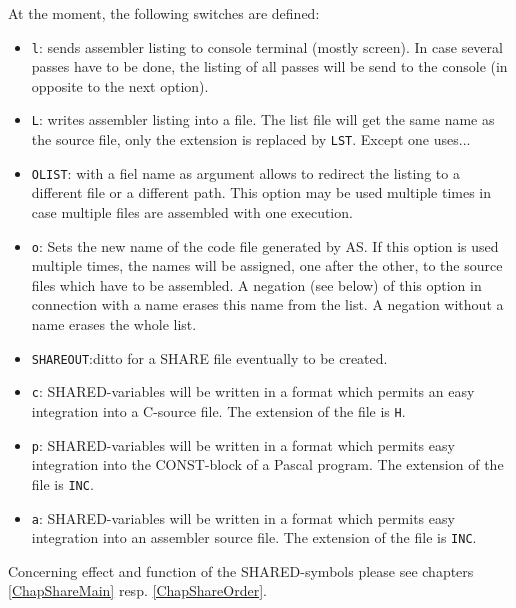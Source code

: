 \documentclass[12pt,twoside]{report}
\makeatletter
\newcommand{\tty}[1]{{\tt #1}}
\newcommand{\ttindex}[1]{\index{#1@{\tt #1}}}
\makeatother
\begin{document}
At the moment, the following switches are defined:
\ttindex{SHARED}
\begin{itemize}
\item{\tty{l}: sends assembler listing to console terminal (mostly screen).  
      In case several passes have to be done, the listing of all 
      passes will be send to the console (in opposite to the next
      option).}
\item{\tty{L}: writes assembler listing into a file. The list file will get
      the same name as the source file, only the extension is 
      replaced by \tty{LST}.  Except one uses... }
\item{\tty{OLIST}: with a fiel name as argument allows to redirect the
      listing to a different file or a different path.  This option may
      be used multiple times in case multiple files are assembled with
      one execution.}
\item{\tty{o}: Sets the new name of the code file generated by AS.  If this 
      option is used multiple times, the names will be assigned, one
      after the other, to the source files which have to be
      assembled.  A negation (see below) of this option in
      connection with a name erases this name from the list.  A
      negation without a name erases the whole list.}
\item{\tty{SHAREOUT}:ditto for a SHARE file eventually to be created.}
\item{\tty{c}: SHARED-variables will be written in a format which permits 
      an easy integration into a C-source file.  The extension of 
      the file is \tty{H}.}
\item{\tty{p}: SHARED-variables will be written in a format which permits 
      easy integration into the CONST-block of a Pascal program. 
      The extension of the file is \tty{INC}.}
\item{\tty{a}: SHARED-variables will be written in a format which permits 
      easy integration into an assembler source file. The 
      extension of the file is \tty{INC}.}
\end{itemize}
Concerning effect and function of the SHARED-symbols please see 
chapters \ref{ChapShareMain} resp. \ref{ChapShareOrder}.
\end{document}
